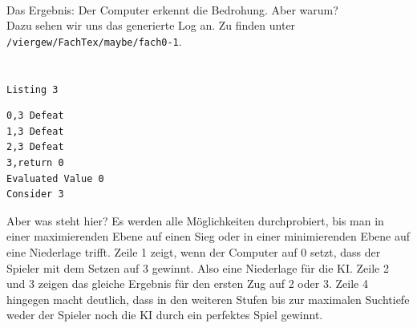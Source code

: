 \documentclass[12pt,a4paper]{article}
\def\code#1{\texttt{#1}}
\begin{document}
	\\Das Ergebnis: Der Computer erkennt die Bedrohung. Aber warum?\\
	Dazu sehen wir uns das generierte Log an. Zu finden unter \code{/viergew/FachTex/maybe/fach0-1}.\\\\\\
	\code{Listing 3}
	\begin{lstlisting}[basicstyle=\sffamily]
0,3 Defeat
1,3 Defeat
2,3 Defeat
3,return 0
Evaluated Value 0
Consider 3
	\end{lstlisting}
	Aber was steht hier? Es werden alle Möglichkeiten durchprobiert, bis man in einer maximierenden Ebene auf einen Sieg oder in einer minimierenden Ebene auf eine Niederlage trifft. Zeile 1 zeigt, wenn der Computer auf 0 setzt, dass der Spieler mit dem Setzen auf 3 gewinnt. Also eine Niederlage für die KI. Zeile 2 und 3 zeigen das gleiche Ergebnis für den ersten Zug auf 2 oder 3. Zeile 4 hingegen macht deutlich, dass in den weiteren Stufen bis zur maximalen Suchtiefe weder der Spieler noch die KI durch ein perfektes Spiel gewinnt.
	\\
\end{document}
